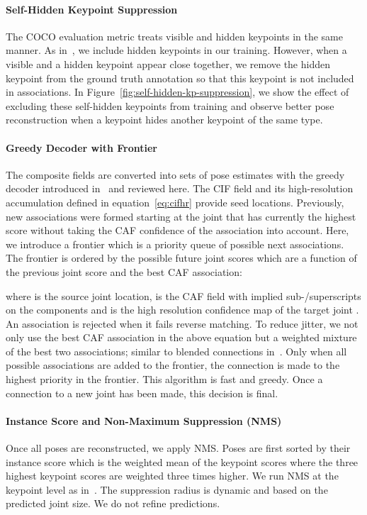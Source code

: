 \documentclass[journal]{IEEEtran}
\begin{document}
\paragraph{Self-Hidden Keypoint Suppression}

The COCO evaluation metric treats visible and hidden keypoints
in the same manner. As in~\cite{kreiss2019pifpaf}, we include
hidden keypoints in our training. However, when a visible
and a hidden keypoint appear close together, we remove the hidden
keypoint from the ground truth annotation so that this keypoint
is not included in associations.
In Figure~\ref{fig:self-hidden-kp-suppression}, we show the
effect of excluding these self-hidden keypoints from training
and observe better pose reconstruction when a keypoint hides
another keypoint of the same type.



\paragraph{Greedy Decoder with Frontier}

The composite fields are converted into sets of pose estimates
with the greedy decoder introduced in~\cite{kreiss2019pifpaf} and reviewed here.
The CIF field and its high-resolution accumulation 
defined in equation~\ref{eq:cifhr} provide seed locations.
Previously, new associations were formed starting at the joint
that has currently the highest score without taking
the CAF confidence of the association into account.
Here, we introduce a frontier which is a priority queue of
possible next associations.
The frontier is ordered by the possible future joint scores which are a function
of the previous joint score and the best CAF association:

where  is the source joint location,  is the CAF field with implied sub-/superscripts on the components
and  is the high resolution confidence map of the target joint .
An association is rejected when it fails reverse matching.
To reduce jitter, we not only use the best CAF association in the above equation but a weighted mixture of the best two associations; similar to blended connections
in~\cite{bazarevsky2019blazeface}.
Only when
all possible associations are added to the frontier,
the connection is made to the highest priority in the frontier.
This algorithm is fast and greedy. Once a connection to a new
joint has been made, this decision is final.

\paragraph{Instance Score and Non-Maximum Suppression (NMS)}
Once all poses are reconstructed, we apply NMS. Poses are first sorted by
their instance score which is the weighted mean of the keypoint scores where the three
highest keypoint scores are weighted three times higher.
We run NMS at the keypoint level as in~\cite{kreiss2019pifpaf,papandreou2018personlab}.
The suppression radius is dynamic and based on the predicted joint size.
We do not refine predictions.
\end{document}

